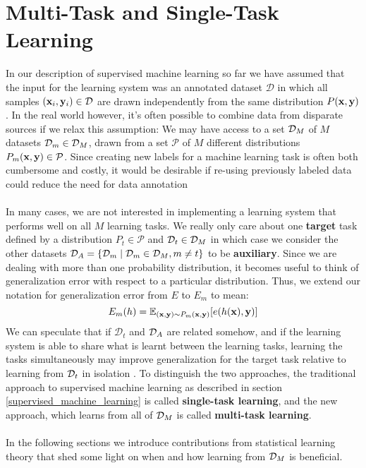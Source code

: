 \section{Multi-Task and Single-Task Learning}
\label{multiTaskAndSingleTaskLearning}

In our description of supervised machine learning so far we have assumed that the input for the learning system was an annotated dataset $\mathcal{D}$ in which all samples $(\mathbf{x}_i, \mathbf{y}_i) \in \mathcal{D}$ are drawn independently from the same distribution $P(\mathbf{x}, \mathbf{y})$. In the real world however, it's often possible to combine data from disparate sources if we relax this assumption: We may have access to a set $\mathcal{D}_M$ of $M$ datasets $\mathcal{D}_m \in \mathcal{D}_M$, drawn from a set $\mathcal{P}$ of $M$ different distributions $P_m(\mathbf{x}, \mathbf{y}) \in \mathcal{P}$. Since creating new labels for a machine learning task is often both cumbersome and costly, it would be desirable if re-using previously labeled data could reduce the need for data annotation
\\\\
In many cases, we are not interested in implementing a learning system that performs well on all $M$ learning tasks. We really only care about one \textbf{target} task defined by a distribution $P_t \in \mathcal{P}$ and $\mathcal{D}_t \in \mathcal{D}_M$ in which case we consider the other datasets $\mathcal{D}_A = \{\mathcal{D}_m \mid \mathcal{D}_m \in \mathcal{D}_M, m \neq t\}$ to be \textbf{auxiliary}. Since we are dealing with more than one probability distribution, it becomes useful to think of generalization error with respect to a particular distribution. Thus, we extend our notation for generalization error from $E$ to $E_m$ to mean:
$$
E_m(h) = \mathbb{E}_{(\mathbf{x},\mathbf{y}) \sim P_m(\mathbf{x},\mathbf{y})}[e(h(\mathbf{x}),\mathbf{y})]
$$
\noindent
We can speculate that if $\mathcal{D}_t$ and $\mathcal{D}_A$ are related somehow, and if the learning system is able to share what is learnt between the learning tasks, learning the tasks simultaneously may improve generalization for the target task relative to learning from $\mathcal{D}_t$ in isolation \citep{caruana1997}. To distinguish the two approaches, the traditional approach to supervised machine learning as described in section \ref{supervised_machine_learning} is called \textbf{single-task learning}, and the new approach, which learns from all of $\mathcal{D}_M$ is called \textbf{multi-task learning}.
\\\\
In the following sections we introduce contributions from statistical learning theory that shed some light on when and how learning from $\mathcal{D}_M$ is beneficial.




